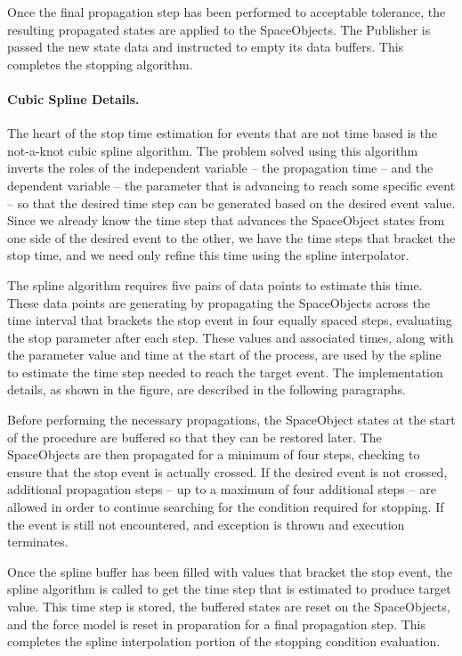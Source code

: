 Once the final propagation step has been performed to acceptable tolerance, the resulting
propagated states are applied to the SpaceObjects.  The Publisher is passed the new state data and
instructed to empty its data buffers.  This completes the stopping algorithm.

\paragraph{Cubic Spline Details.}  The heart of the stop time estimation for events that are not
time based is the not-a-knot cubic spline algorithm.  The problem solved using this algorithm
inverts the roles of the independent variable -- the propagation time -- and the dependent variable
-- the parameter that is advancing to reach some specific event -- so that the desired time step
can be generated based on the desired event value.  Since we already know the time step that
advances the SpaceObject states from one side of the desired event to the other, we have the time
steps that bracket the stop time, and we need only refine this time using the spline interpolator.

The spline algorithm requires five pairs of data points to estimate this time.  These data points
are generating by propagating the SpaceObjects across the time interval that brackets the stop
event in four equally spaced steps, evaluating the stop parameter after each step.  These values
and associated times, along with the parameter value and time at the start of the process, are used
by the spline to estimate the time step needed to reach the target event.  The implementation
details, as shown in the figure, are described in the following paragraphs.

Before performing the necessary propagations, the SpaceObject states at the start of the procedure
are buffered so that they can be restored later.  The SpaceObjects are then propagated for a
minimum of four steps, checking to ensure that the stop event is actually crossed.  If the desired
event is not crossed, additional propagation steps -- up to a maximum of four additional steps --
are allowed in order to continue searching for the condition required for stopping.  If the event
is still not encountered, and exception is thrown and execution terminates.

Once the spline buffer has been filled with values that bracket the stop event, the spline algorithm
is called to get the time step that is estimated to produce target value.  This time step is stored,
the buffered states are reset on the SpaceObjects, and the force model is reset in proparation for a
final propagation step.  This completes the spline interpolation portion of the stopping condition
evaluation.


